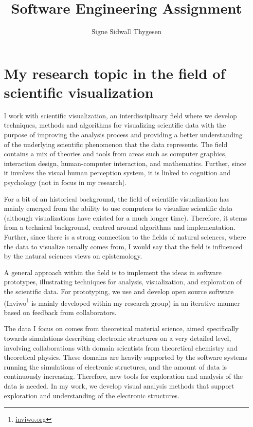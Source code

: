 \documentclass[11pt]{article}
\title{Software Engineering Assignment}
\author{Signe Sidwall Thygesen}
\date{}
\begin{document}
\maketitle

\section{My research topic in the field of scientific visualization}

I work with scientific visualization, an interdisciplinary field where we develop techniques, methods and algorithms for visualizing scientific data with the purpose of improving the analysis process and providing a better understanding of the underlying scientific phenomenon that the data represents.
The field contains a mix of theories and tools from areas such as computer graphics, interaction design, human-computer interaction, and mathematics. Further, since it involves the visual human perception system, it is linked to cognition and psychology (not in focus in my research).

For a bit of an historical background, the field of scientific visualization has mainly emerged from the ability to use computers to visualize scientific data (although visualizations have existed for a much longer time).
Therefore, it stems from a technical background, centred around algorithms and implementation. Further, since there is a strong connection to the fields of natural sciences, where the data to visualize usually comes from, I would say that the field is influenced by the natural sciences views on epistemology.

A general approach within the field is to implement the ideas in software prototypes, illustrating techniques for analysis, visualization, and exploration of the scientific data. 
For prototyping, we use and develop open source software (Inviwo\footnote{\hyperlink{https://inviwo.org/}{inviwo.org}} is mainly developed within my research group) in an iterative manner based on feedback from collaborators.

The data I focus on comes from theoretical material science, aimed specifically towards simulations describing electronic structures on a very detailed level,
involving collaborations with domain scientists from theoretical chemistry and theoretical physics. These domains are heavily supported by the software systems running the simulations of electronic structures, and the amount of data is continuously increasing. Therefore, new tools for exploration and analysis of the data is needed.
In my work, we develop visual analysis methods that support exploration and understanding of the electronic structures. 
\end{document}
